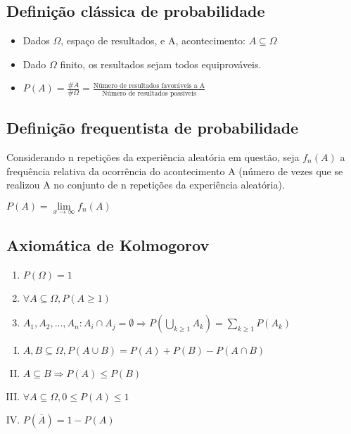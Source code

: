 \subsection{Definição clássica de probabilidade}
\begin{itemize}
    \item Dados $\Omega$, espaço de resultados, e A, acontecimento: $A \subseteq \Omega$
    \item Dado $\Omega$ finito, os resultados sejam todos equiprováveis.
    \item $P(A) = \frac{\# A}{\# \Omega} = \frac{\text{Número de resultados favoráveis a A}}{\text{Número de resultados possíveis}}$
\end{itemize}

\subsection{Definição frequentista de probabilidade}
Considerando n repetições da experiência aleatória em questão, seja $f_n(A)$ a frequência relativa da ocorrência do acontecimento A (número de vezes que se realizou A no conjunto de n repetições da experiência aleatória).
\begin{center}
    $P(A) = \lim\limits_{x \to \infty} f_n(A)$
\end{center}

\subsection{Axiomática de Kolmogorov}
\begin{enumerate}
    \item $P(\Omega) = 1$
    \item $\forall A \subseteq \Omega, P(A \geq 1)$
    \item $A_1, A_2, ..., A_n: A_i \cap A_j = \emptyset \Rightarrow P (\bigcup\limits_{k \geq 1} A_k) = \sum\limits_{k\geq 1} P(A_k)$
\end{enumerate}
\begin{enumerate}[I)]
    \item $A, B \subseteq \Omega, P(A \cup B) = P(A) + P(B) - P(A \cap B) $
    \item $A \subseteq B \Rightarrow P(A) \leq P(B)$
    \item $\forall A \subseteq \Omega, 0 \leq P(A) \leq 1$
    \item $P(\overline{A}) = 1 - P(A)$
\end{enumerate}

